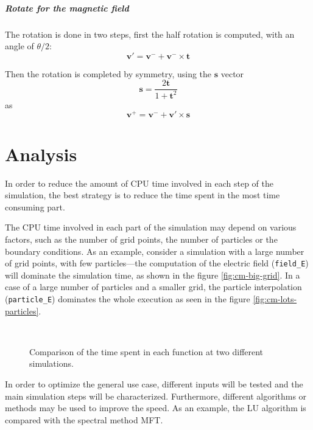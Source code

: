 \documentclass[a4paper]{report}
\newcommand*\V[1]{\bm{#1}}
\renewcommand*{\v}{\V{v}}
\begin{document}
\paragraph{Rotate for the magnetic field} The rotation is done in two steps, 
first the half rotation is computed, with an angle of $\theta/2$:
$$\v' = \v^- + \v^- \times \V t $$

Then the rotation is completed by symmetry, using the $\V s$ vector
$$ \V s = \frac{2 \V t}{1 + \V t^2} $$
as
$$ \V{v^+} = \V{v^-} + \V{v}' \times \V{s} $$

\chapter{Analysis}


In order to reduce the amount of CPU time involved in each step of the 
simulation, the best strategy is to reduce the time spent in the most time 
consuming part.

The CPU time involved in each part of the simulation may depend on various 
factors, such as the number of grid points, the number of particles or the 
boundary conditions. As an example, consider a simulation with a large number of 
grid points, with few particles---the computation of the electric field 
(\texttt{field\_E}) will dominate the simulation time, as shown in the figure 
\ref{fig:cm-big-grid}. In a case of a large number of particles and a smaller 
grid, the particle interpolation (\texttt{particle\_E}) dominates the whole 
execution as seen in the figure \ref{fig:cm-lots-particles}.

\begin{figure}[h]
	\centering
	\\
	\caption{Comparison of the time spent in each function at two different 
	simulations.}
\end{figure}

In order to optimize the general use case, different inputs will be tested and 
the main simulation steps will be characterized. Furthermore, different 
algorithms or methods may be used to improve the speed. As an example, the LU 
algorithm is compared with the spectral method MFT.
\end{document}
